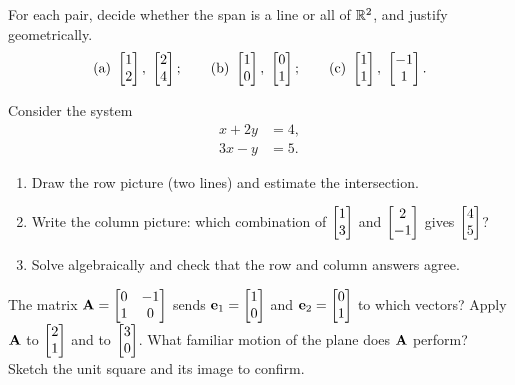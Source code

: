 \begin{exercise}
For each pair, decide whether the span is a line or all of $\mathbb{R}^2$, and justify geometrically.
\[
\text{(a) } \begin{bmatrix}1\\2\end{bmatrix},\ \begin{bmatrix}2\\4\end{bmatrix};\qquad
\text{(b) } \begin{bmatrix}1\\0\end{bmatrix},\ \begin{bmatrix}0\\1\end{bmatrix};\qquad
\text{(c) } \begin{bmatrix}1\\1\end{bmatrix},\ \begin{bmatrix}-1\\1\end{bmatrix}.
\]
\end{exercise}

\begin{exercise}
Consider the system
\[
\begin{aligned}
x + 2y &= 4,\\
3x - y &= 5.
\end{aligned}
\]
\begin{enumerate}
  \item Draw the row picture (two lines) and estimate the intersection.
  \item Write the column picture: which combination of $\begin{bmatrix}1\\3\end{bmatrix}$ and $\begin{bmatrix}2\\-1\end{bmatrix}$ gives
  $\begin{bmatrix}4\\5\end{bmatrix}$?
  \item Solve algebraically and check that the row and column answers agree.
\end{enumerate}
\end{exercise}

\begin{exercise}
The matrix $\mathbf{A} = \begin{bmatrix} 0 & -1 \\ 1 & 0 \end{bmatrix}$ sends $\mathbf{e}_1=\begin{bmatrix}1\\0\end{bmatrix}$ and
$\mathbf{e}_2=\begin{bmatrix}0\\1\end{bmatrix}$ to which vectors? Apply $\mathbf{A}$ to $\begin{bmatrix}2\\1\end{bmatrix}$ and to $\begin{bmatrix}3\\0\end{bmatrix}$.
What familiar motion of the plane does $\mathbf{A}$ perform? Sketch the unit square and its image to
confirm.
\end{exercise}

